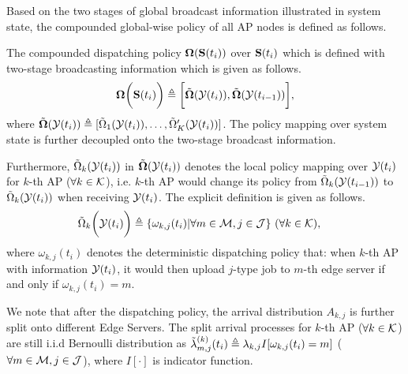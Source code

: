 Based on the two stages of global broadcast information illustrated in system state, the compounded global-wise policy of all AP nodes is defined as follows.
\begin{definition}
    The compounded dispatching policy $\boldsymbol{\Omega}(\mathbf{S}(t_{i}))$ over $\mathbf{S}(t_{i})$ which is defined with two-stage broadcasting information which is given as follows.
    \begin{align}
        \boldsymbol{\Omega}\bigg(\mathbf{S}(t_{i})\bigg) \triangleq \bigg[
            \tilde{\boldsymbol{\Omega}}(\mathcal{Y}(t_{i})), \tilde{\boldsymbol{\Omega}}(\mathcal{Y}(t_{i-1}))
        \bigg],
    \end{align}
    where
    $\tilde{\boldsymbol{\Omega}}(\mathcal{Y}(t_{i})) \triangleq [\tilde{\Omega}_{1}(\mathcal{Y}(t_{i})), \dots, \tilde{\Omega}'_{K}(\mathcal{Y}(t_{i}))]$.
    The policy mapping over system state is further decoupled onto the two-stage broadcast information.

    Furthermore,
    $\tilde{\Omega}_{k}(\mathcal{Y}(t_{i}))$ in $\tilde{\boldsymbol{\Omega}}(\mathcal{Y}(t_{i}))$
    denotes the local policy mapping over $\mathcal{Y}(t_{i})$ for $k$-th AP ($\forall k\in\mathcal{K}$), i.e. $k$-th AP would change its policy from $\tilde{\Omega}_{k}(\mathcal{Y}(t_{i-1}))$ to $\tilde{\Omega}_{k}(\mathcal{Y}(t_{i}))$ when receiving $\mathcal{Y}(t_{i})$.
    The explicit definition is given as follows.
    \begin{align}
        &\tilde{\Omega}_{k}\bigg(\mathcal{Y}(t_{i})\bigg) \triangleq \{\omega_{k,j}(t_{i})|\forall m\in\mathcal{M}, j\in\mathcal{J}\}
        ~(\forall k\in\mathcal{K}),
        \label{def_action}
    \end{align}
    where $\omega_{k,j}(t_{i})$ denotes the deterministic dispatching policy that: when $k$-th AP with information $\mathcal{Y}(t_{i})$, it would then upload $j$-type job to $m$-th edge server if and only if $\omega_{k,j}(t_{i})=m$.
\end{definition}

We note that after the dispatching policy, the arrival distribution $A_{k,j}$ is further split onto different Edge Servers. The split arrival processes for $k$-th AP ($\forall k\in\mathcal{K}$) are still i.i.d Bernoulli distribution as
$\tilde{\lambda}^{(k)}_{m,j}(t_{i}) \triangleq \lambda_{k,j} I[\omega_{k,j}(t_i) = m]$ ($\forall m\in\mathcal{M}, j\in\mathcal{J}$), where $I[\cdot]$ is indicator function.


